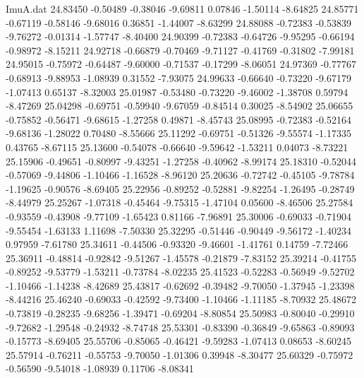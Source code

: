 \begin{filecontents}{ImuA.dat}
  24.83450   -0.50489   -0.38046   -9.69811    0.07846   -1.50114   -8.64825
  24.85771   -0.67119   -0.58146   -9.68016    0.36851   -1.44007   -8.63299
  24.88088   -0.72383   -0.53839   -9.76272   -0.01314   -1.57747   -8.40400
  24.90399   -0.72383   -0.64726   -9.95295   -0.66194   -0.98972   -8.15211
  24.92718   -0.66879   -0.70469   -9.71127   -0.41769   -0.31802   -7.99181
  24.95015   -0.75972   -0.64487   -9.60000   -0.71537   -0.17299   -8.06051
  24.97369   -0.77767   -0.68913   -9.88953   -1.08939    0.31552   -7.93075
  24.99633   -0.66640   -0.73220   -9.67179   -1.07413    0.65137   -8.32003
  25.01987   -0.53480   -0.73220   -9.46002   -1.38708    0.59794   -8.47269
  25.04298   -0.69751   -0.59940   -9.67059   -0.84514    0.30025   -8.54902
  25.06655   -0.75852   -0.56471   -9.68615   -1.27258    0.49871   -8.45743
  25.08995   -0.72383   -0.52164   -9.68136   -1.28022    0.70480   -8.55666
  25.11292   -0.69751   -0.51326   -9.55574   -1.17335    0.43765   -8.67115
  25.13600   -0.54078   -0.66640   -9.59642   -1.53211    0.04073   -8.73221
  25.15906   -0.49651   -0.80997   -9.43251   -1.27258   -0.40962   -8.99174
  25.18310   -0.52044   -0.57069   -9.44806   -1.10466   -1.16528   -8.96120
  25.20636   -0.72742   -0.45105   -9.78784   -1.19625   -0.90576   -8.69405
  25.22956   -0.89252   -0.52881   -9.82254   -1.26495   -0.28749   -8.44979
  25.25267   -1.07318   -0.45464   -9.75315   -1.47104    0.05600   -8.46506
  25.27584   -0.93559   -0.43908   -9.77109   -1.65423    0.81166   -7.96891
  25.30006   -0.69033   -0.71904   -9.55454   -1.63133    1.11698   -7.50330
  25.32295   -0.51446   -0.90449   -9.56172   -1.40234    0.97959   -7.61780
  25.34611   -0.44506   -0.93320   -9.46601   -1.41761    0.14759   -7.72466
  25.36911   -0.48814   -0.92842   -9.51267   -1.45578   -0.21879   -7.83152
  25.39214   -0.41755   -0.89252   -9.53779   -1.53211   -0.73784   -8.02235
  25.41523   -0.52283   -0.56949   -9.52702   -1.10466   -1.14238   -8.42689
  25.43817   -0.62692   -0.39482   -9.70050   -1.37945   -1.23398   -8.44216
  25.46240   -0.69033   -0.42592   -9.73400   -1.10466   -1.11185   -8.70932
  25.48672   -0.73819   -0.28235   -9.68256   -1.39471   -0.69204   -8.80854
  25.50983   -0.80040   -0.29910   -9.72682   -1.29548   -0.24932   -8.74748
  25.53301   -0.83390   -0.36849   -9.65863   -0.89093   -0.15773   -8.69405
  25.55706   -0.85065   -0.46421   -9.59283   -1.07413    0.08653   -8.60245
  25.57914   -0.76211   -0.55753   -9.70050   -1.01306    0.39948   -8.30477
  25.60329   -0.75972   -0.56590   -9.54018   -1.08939    0.11706   -8.08341

\end{filecontents}
